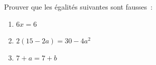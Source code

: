 \documentclass[exercice]{thedocument}%
\begin{document}
%
Prouver que les égalités suivantes sont fausses~:
\begin{enumerate}
    \item $6x=6$
    \item $2(15-2a)=30-4a^2$
    \item $7+a=7+b$
\end{enumerate}
\end{document}
